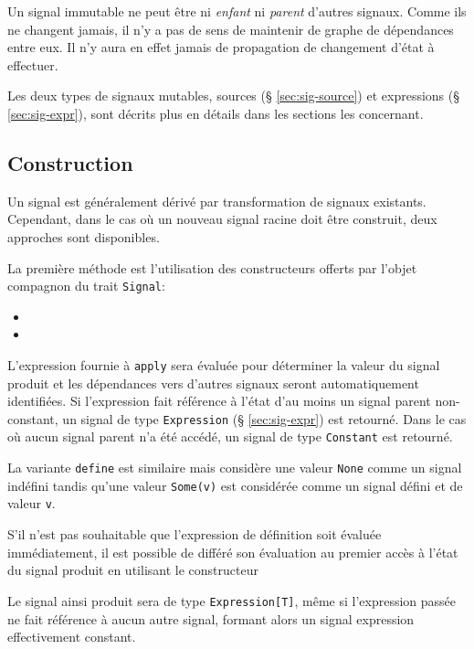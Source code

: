 Un signal immutable ne peut être ni \emph{enfant} ni \emph{parent} d'autres signaux. Comme ils ne changent jamais, il n'y a pas de sens de maintenir de graphe de dépendances entre eux. Il n'y aura en effet jamais de propagation de changement d'état à effectuer.

Les deux types de signaux mutables, sources (§ \ref{sec:sig-source}) et expressions (§ \ref{sec:sig-expr}), sont décrits plus en détails dans les sections les concernant.

\subsection{Construction}
Un signal est généralement dérivé par transformation de signaux existants. Cependant, dans le cas où un nouveau signal racine doit être construit, deux approches sont disponibles.

La première méthode est l'utilisation des constructeurs offerts par l'objet compagnon du trait \texttt{Signal}:

\begin{itemize}
	\item {}
	\item {}
\end{itemize}

L'expression fournie à \texttt{apply} sera évaluée pour déterminer la valeur du signal produit et les dépendances vers d'autres signaux seront automatiquement identifiées. Si l'expression fait référence à l'état d'au moins un signal parent non-constant, un signal de type \texttt{Expression} (§ \ref{sec:sig-expr}) est retourné. Dans le cas où aucun signal parent n'a été accédé, un signal de type \texttt{Constant} est retourné.

La variante \texttt{define} est similaire mais considère une valeur \texttt{None} comme un signal indéfini tandis qu'une valeur \texttt{Some(v)} est considérée comme un signal défini et de valeur \texttt{v}. 

S'il n'est pas souhaitable que l'expression de définition soit évaluée immédiatement, il est possible de différé son évaluation au premier accès à l'état du signal produit en utilisant le constructeur
\begin{center}
\end{center}
Le signal ainsi produit sera de type \texttt{Expression[T]}, même si l'expression passée ne fait référence à aucun autre signal, formant alors un signal expression effectivement constant.

